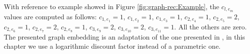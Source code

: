 With reference to example showed in Figure \ref{fig:graph-rec:Example}, the $c_{l,e_m}$ values are computed as follows: 
$c_{1,e_1} =1$, $c_{1,e_2} =1$, $c_{1,e_3} = 1$, $c_{2,e_4} = 1$, $c_{2,e_5} =2$, $c_{2,e_6} =1$, $c_{2,e_7} =2$, $c_{2,e_8} =1$, $c_{3,e_9} =2$, $c_{3,e_{10}} =2$, $c_{3,e_{11}} =1$. All the others are zero.
The presented graph embedding is an adaptation of the one presented in \cite{ODMD14a}, in this chapter we use a logarithmic discount factor instead of a parametric one.  
